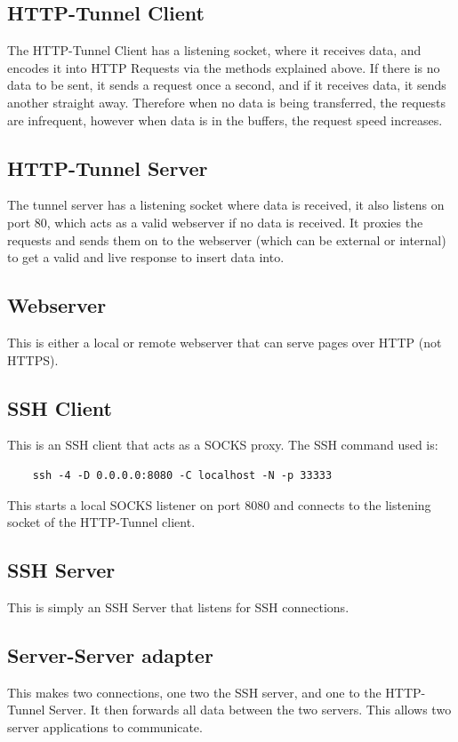 \documentclass[12pt]{article}
\begin{document}
\subsection{HTTP-Tunnel Client}
The HTTP-Tunnel Client has a listening socket, where it receives data, and encodes it into HTTP Requests via the methods explained above.
If there is no data to be sent, it sends a request once a second, and if it receives data, it sends another straight away.
Therefore when no data is being transferred, the requests are infrequent, however when data is in the buffers, the request speed increases.

\subsection{HTTP-Tunnel Server}
The tunnel server has a listening socket where data is received, it also listens on port 80, which acts as a valid webserver if no data is received. It proxies the requests and sends them on to the webserver (which can be external or internal) to get a valid and live response to insert data into.

\subsection{Webserver}
This is either a local or remote webserver that can serve pages over HTTP (not HTTPS).

\subsection{SSH Client}
This is an SSH client that acts as a SOCKS proxy.
The SSH command used is:
\begin{verbatim}
    ssh -4 -D 0.0.0.0:8080 -C localhost -N -p 33333
\end{verbatim}
This starts a local SOCKS listener on port 8080 and connects to the listening socket of the HTTP-Tunnel client.

\subsection{SSH Server}
This is simply an SSH Server that listens for SSH connections.

\subsection{Server-Server adapter}
This makes two connections, one two the SSH server, and one to the HTTP-Tunnel Server.
It then forwards all data between the two servers.
This allows two server applications to communicate.
\end{document}
